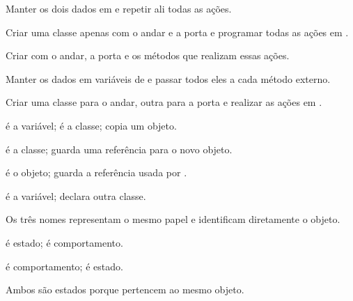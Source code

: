 \documentclass[11pt,a4paper]{article}
\begin{document}
\noindent\begin{minipage}[t]{.485\textwidth}
\begin{alternativas}
\item Manter os dois dados em  e repetir ali todas as ações.
\item Criar uma classe apenas com o andar e a porta e programar todas as ações em .
\item Criar  com o andar, a porta e os métodos que realizam essas ações.
\item Manter os dados em variáveis de  e passar todos eles a cada método externo.
\item Criar uma classe para o andar, outra para a porta e realizar as ações em .
\end{alternativas}
\begin{alternativas}
\item {} é a variável;  é a classe;  copia um objeto.
\item {} é a classe;  guarda uma referência para o novo objeto.
\item {} é o objeto;  guarda a referência usada por .
\item {} é a variável;  declara outra classe.
\item Os três nomes representam o mesmo papel e identificam diretamente o objeto.
\end{alternativas}
\begin{alternativas}
\item {} é estado;  é comportamento.
\item {} é comportamento;  é estado.
\item Ambos são estados porque pertencem ao mesmo objeto.

\end{alternativas}
\end{minipage}
\end{document}
